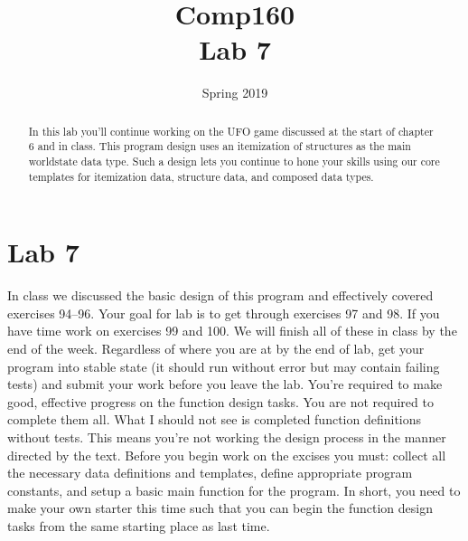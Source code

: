 \documentclass[nobib]{tufte-handout}
\title{Comp160 \\ Lab 7 }
\author{}
\date{ Spring 2019 }
\begin{document}
\maketitle

\begin{abstract}
In this lab you'll continue working on the UFO game discussed at the start of chapter 6 and in class. This program design uses an itemization of structures as the main worldstate data type.  Such a design lets you continue to hone your skills using our core templates for itemization data, structure data, and composed data types.
\end{abstract}

\section*{Lab 7}

In class we discussed the basic design of this program and effectively covered exercises 94--96. Your goal for lab is to get through exercises 97 and 98. If you have time work on exercises 99 and 100. We will finish all of these in class by the end of the week.  Regardless of where you are at by the end of lab, get your program into stable state (it should run without error but may contain failing tests) and submit your work before you leave the lab. You're required to make good, effective progress on the function design tasks.  You are not required to complete them all. What I should not see is completed function definitions without tests. This means you're not working the design process in the manner directed by the text.  Before you begin work on the excises you must: collect all the necessary data definitions and templates, define appropriate program constants, and setup a basic main function for the program. In short, you need to make your own starter this time such that you can begin the function design tasks from the same starting place as last time.
\end{document}
